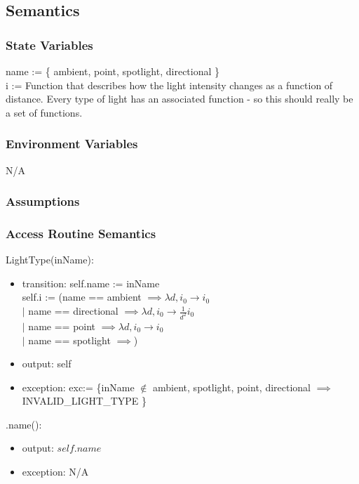 \documentclass[12pt, titlepage]{article}
\begin{document}
\subsection{Semantics}
\subsubsection{State Variables}
name := \{ ambient, point, spotlight, directional \} \\
i := Function that describes how the light intensity changes as a function of 
distance. Every type of light has an associated function - so this should 
really be a set of functions.\\

\subsubsection{Environment Variables}
N/A

\subsubsection{Assumptions}

\subsubsection{Access Routine Semantics}
\noindent LightType(inName):
\begin{itemize}
	\item transition: self.name := inName \\
					  self.i := (name == ambient $\implies \lambda d, i_{0} \to 
					  i_{0}$ \\
					  $|$  name == directional $\implies \lambda d, i_{0} \to 
					  \frac{1}{d^2}i_{0}$ \\
					  $|$ name == point $\implies \lambda d, i_{0} \to 
					  i_{0}$\\
					  $|$ name == spotlight $\implies$)
	\item output: self
	\item exception: exc:= \{inName $\notin$ {ambient, spotlight, point, 
	directional} $\implies$ INVALID\_LIGHT\_TYPE \}
\end{itemize}

\noindent .name():
\begin{itemize}
	\item output: $self.name$
	\item exception: N/A
\end{itemize}
\end{document}
